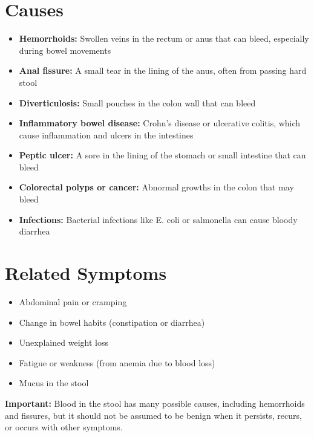 \section*{Causes}
\begin{itemize}
  \item \textbf{Hemorrhoids:} Swollen veins in the rectum or anus that can bleed, especially during bowel movements
  \item \textbf{Anal fissure:} A small tear in the lining of the anus, often from passing hard stool
  \item \textbf{Diverticulosis:} Small pouches in the colon wall that can bleed
  \item \textbf{Inflammatory bowel disease:} Crohn's disease or ulcerative colitis, which cause inflammation and ulcers in the intestines
  \item \textbf{Peptic ulcer:} A sore in the lining of the stomach or small intestine that can bleed
  \item \textbf{Colorectal polyps or cancer:} Abnormal growths in the colon that may bleed
  \item \textbf{Infections:} Bacterial infections like E. coli or salmonella can cause bloody diarrhea
\end{itemize}

\section*{Related Symptoms}
\begin{itemize}
  \item Abdominal pain or cramping
  \item Change in bowel habits (constipation or diarrhea)
  \item Unexplained weight loss
  \item Fatigue or weakness (from anemia due to blood loss)
  \item Mucus in the stool
\end{itemize}
\textbf{Important:} Blood in the stool has many possible causes, including hemorrhoids and fissures, but it should not be assumed to be benign when it persists, recurs, or occurs with other symptoms.

